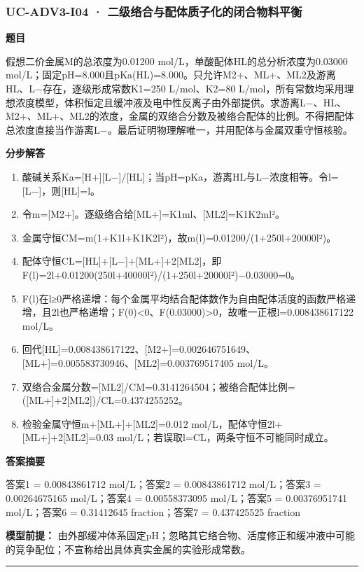 \documentclass[UTF8,11pt,a4paper]{ctexart}
\begin{document}
\subsubsection*{UC-ADV3-I04 · 二级络合与配体质子化的闭合物料平衡}
\noindent\textbf{题目}\par
假想二价金属M的总浓度为0.01200 mol/L，单酸配体HL的总分析浓度为0.03000 mol/L；固定pH=8.000且pKa(HL)=8.000。只允许M2+、ML+、ML2及游离HL、L−存在，逐级形成常数K1=250 L/mol、K2=80 L/mol，所有常数均采用理想浓度模型，体积恒定且缓冲液及电中性反离子由外部提供。求游离L−、HL、M2+、ML+、ML2的浓度，金属的双络合分数及被络合配体的比例。不得把配体总浓度直接当作游离L−。最后证明物理解唯一，并用配体与金属双重守恒核验。\par
\medskip\noindent\textbf{分步解答}
\begin{enumerate}
\item 酸碱关系Ka=[H+][L−]/[HL]；当pH=pKa，游离HL与L−浓度相等。令l=[L−]，则[HL]=l。
\item 令m=[M2+]。逐级络合给[ML+]=K1ml、[ML2]=K1K2ml²。
\item 金属守恒CM=m(1+K1l+K1K2l²)，故m(l)=0.01200/(1+250l+20000l²)。
\item 配体守恒CL=[HL]+[L−]+[ML+]+2[ML2]，即F(l)=2l+0.01200(250l+40000l²)/(1+250l+20000l²)−0.03000=0。
\item F(l)在l≥0严格递增：每个金属平均结合配体数作为自由配体活度的函数严格递增，且2l也严格递增；F(0)<0、F(0.03000)>0，故唯一正根l=0.008438617122 mol/L。
\item 回代[HL]=0.008438617122、[M2+]=0.002646751649、[ML+]=0.005583730946、[ML2]=0.003769517405 mol/L。
\item 双络合金属分数=[ML2]/CM=0.3141264504；被络合配体比例=([ML+]+2[ML2])/CL=0.4374255252。
\item 检验金属守恒m+[ML+]+[ML2]=0.012 mol/L，配体守恒2l+[ML+]+2[ML2]=0.03 mol/L；若误取l=CL，两条守恒不可能同时成立。
\end{enumerate}
\noindent\textbf{答案摘要}\par
答案1 = 0.00843861712 mol/L；答案2 = 0.00843861712 mol/L；答案3 = 0.00264675165 mol/L；答案4 = 0.00558373095 mol/L；答案5 = 0.00376951741 mol/L；答案6 = 0.31412645 fraction；答案7 = 0.437425525 fraction\par
\noindent\textbf{模型前提：}
由外部缓冲体系固定pH；忽略其它络合物、活度修正和缓冲液中可能的竞争配位；不宣称给出具体真实金属的实验形成常数。\par
\medskip\hrule\medskip
{}
\end{document}

